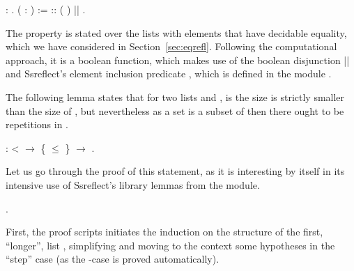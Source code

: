 \begin{coqdoccode}
\coqdocemptyline
\coqdocnoindent
{}  : .\coqdoceol
\coqdocemptyline
\coqdocnoindent
{}  ( :  ) :=\coqdoceol
\coqdocindent{1.00em}
    ::   (  ) ||    .\coqdoceol
\coqdocemptyline
\end{coqdoccode}


The property  is stated over the lists with elements that
have decidable equality, which we have considered in
Section~\ref{sec:eqrefl}. Following the computational approach, it
is a boolean function, which makes use of the boolean disjunction ||
and Ssreflect's element inclusion predicate , which is defined in
the module .


The following lemma states that for two lists  and , is the
size  is strictly smaller than the size of , but
nevertheless  as a set is a subset of  then there ought to
be repetitions in .


\begin{coqdoccode}
\coqdocemptyline
\coqdocnoindent
{}    :\coqdoceol
\coqdocindent{4.00em}
  <   \ensuremath{\rightarrow} \{  \ensuremath{\le} \} \ensuremath{\rightarrow}  .\coqdoceol
\coqdocemptyline
\end{coqdoccode}


Let us go through the proof of this statement, as it is interesting by
itself in its intensive use of Ssreflect's library lemmas from the
 module.


\begin{coqdoccode}
\coqdocemptyline
\coqdocnoindent
{}.\coqdoceol
\coqdocemptyline
\end{coqdoccode}


First, the proof scripts initiates the induction on the structure of
the first, ``longer'', list , simplifying and moving to the context
some hypotheses in the ``step'' case (as the -case is proved
automatically).


